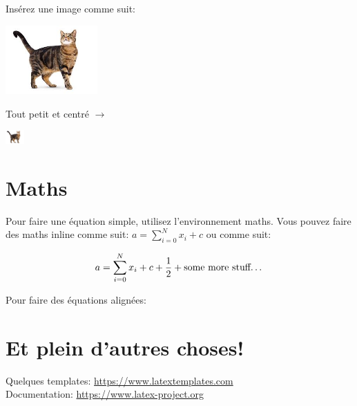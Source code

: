 \documentclass[paper=a4, fontsize=11pt]{article}
\begin{document}
\vspace{0.5cm} %


Insérez une image comme suit:

\includegraphics[width=100pt]{myimage.jpg} %

Tout petit et centré $\rightarrow$

\begin{center}
\includegraphics[width=20pt]{myimage.jpg} %
\end{center}

\section{Maths}

Pour faire une équation simple, utilisez l'environnement maths. Vous pouvez faire des maths inline
comme suit: $a = \sum_{i=0}^{N} x_i + c$ ou comme suit:

\[ a = \sum_{i=0}^{N} x_i + c + \dfrac{1}{2} + \text{some more stuff\dots}\]


Pour faire des équations alignées:


\section{Et plein d'autres choses!}

Quelques templates: \url{https://www.latextemplates.com} \\
Documentation: \url{https://www.latex-project.org}
\end{document}
